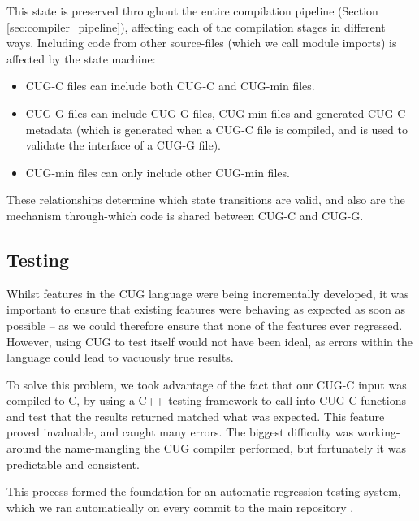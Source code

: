 \documentclass[a4paper,12pt,twoside,openright]{report}
\begin{document}
This state is preserved throughout the entire compilation pipeline (Section
\ref{sec:compiler_pipeline}), affecting each of the compilation stages in
different ways. Including code from other source-files (which we call module
imports) is affected by the state machine:

\begin{itemize}

    \item CUG-C files can include both CUG-C and CUG-min files.

    \item CUG-G files can include CUG-G files, CUG-min files and generated
    CUG-C metadata (which is generated when a CUG-C file is compiled, and is
    used to validate the interface of a CUG-G file).

    \item CUG-min files can only include other CUG-min files.

\end{itemize}

These relationships determine which state transitions are valid, and also are
the mechanism through-which code is shared between CUG-C and CUG-G.

\subsection{Testing}

\label{sec:testing}

Whilst features in the CUG language were being incrementally developed, it was
important to ensure that existing features were behaving as expected as soon as
possible -- as we could therefore ensure that none of the features ever
regressed. However, using CUG to test itself would not have been ideal, as
errors within the language could lead to vacuously true results.

To solve this problem, we took advantage of the fact that our CUG-C input was
compiled to C, by using a C++ testing framework to call-into CUG-C functions
and test that the results returned matched what was expected. This feature
proved invaluable, and caught many errors. The biggest difficulty was
working-around the name-mangling the CUG compiler performed, but fortunately it
was predictable and consistent.

This process formed the foundation for an automatic regression-testing system,
which we ran automatically on every commit to the main repository
\cite{ProjectSource} \cite{AutomatedTestCode} \cite{AutomatedTestOutput}.
\end{document}
